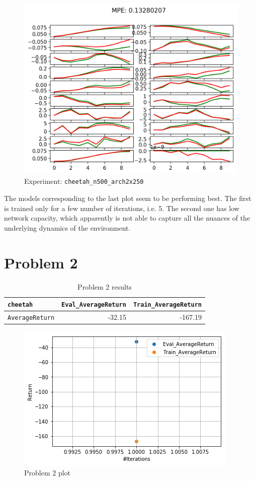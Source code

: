 \documentclass[11pt]{article}
\begin{document}
\begin{figure}[htbp]
\centering
\includegraphics[width=.9\linewidth]{./hw2_q1_cheetah_n500_arch2x250_cheetah-ift6163-v0_17-02-2022_21-24-36/itr_0_predictions.png}
\caption{Experiment: \texttt{cheetah\_n500\_arch2x250}}
\end{figure}

The models corresponding to the last plot seem to be performing best. The first is trained only for a few number of iterations, i.e. 5. The second one has low network capacity, which apparently is not able to capture all the nuances of the underlying dynamics of the environment.

\clearpage

\section{Problem 2}
\label{sec:orgadd9344}

\begin{table}[htbp]
\caption{Problem 2 results}
\centering
\begin{tabular}{l|r|r}
\hline
\texttt{cheetah} & \texttt{Eval\_AverageReturn} & \texttt{Train\_AverageReturn}\\
\hline
\texttt{AverageReturn} & -32.15 & -167.19\\
\hline
\end{tabular}
\end{table}

\begin{figure}[htbp]
\centering
\includegraphics[width=.9\linewidth]{./q2.png}
\caption{Problem 2 plot}
\end{figure}
\end{document}
